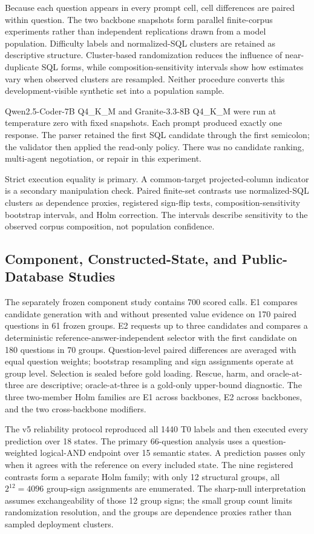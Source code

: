 \documentclass[applsci,article,submit,moreauthors]{Definitions/mdpi}
\begin{document}
Because each question appears in every prompt cell, cell differences are paired within question. The two backbone snapshots form parallel finite-corpus experiments rather than independent replications drawn from a model population. Difficulty labels and normalized-SQL clusters are retained as descriptive structure. Cluster-based randomization reduces the influence of near-duplicate SQL forms, while composition-sensitivity intervals show how estimates vary when observed clusters are resampled. Neither procedure converts this development-visible synthetic set into a population sample.

Qwen2.5-Coder-7B Q4\_K\_M and Granite-3.3-8B Q4\_K\_M were run at temperature zero with fixed snapshots. Each prompt produced exactly one response. The parser retained the first SQL candidate through the first semicolon; the validator then applied the read-only policy. There was no candidate ranking, multi-agent negotiation, or repair in this experiment.

Strict execution equality is primary. A common-target projected-column indicator is a secondary manipulation check. Paired finite-set contrasts use normalized-SQL clusters as dependence proxies, registered sign-flip tests, composition-sensitivity bootstrap intervals, and Holm correction. The intervals describe sensitivity to the observed corpus composition, not population confidence.

\subsection{Component, Constructed-State, and Public-Database Studies}

The separately frozen component study contains 700 scored calls. E1 compares candidate generation with and without presented value evidence on 170 paired questions in 61 frozen groups. E2 requests up to three candidates and compares a deterministic reference-answer-independent selector with the first candidate on 180 questions in 70 groups. Question-level paired differences are averaged with equal question weights; bootstrap resampling and sign assignments operate at group level. Selection is sealed before gold loading. Rescue, harm, and oracle-at-three are descriptive; oracle-at-three is a gold-only upper-bound diagnostic. The three two-member Holm families are E1 across backbones, E2 across backbones, and the two cross-backbone modifiers.

The v5 reliability protocol reproduced all 1440 T0 labels and then executed every prediction over 18 states. The primary 66-question analysis uses a question-weighted logical-AND endpoint over 15 semantic states. A prediction passes only when it agrees with the reference on every included state. The nine registered contrasts form a separate Holm family; with only 12 structural groups, all $2^{12}=4096$ group-sign assignments are enumerated. The sharp-null interpretation assumes exchangeability of those 12 group signs; the small group count limits randomization resolution, and the groups are dependence proxies rather than sampled deployment clusters.
\end{document}
